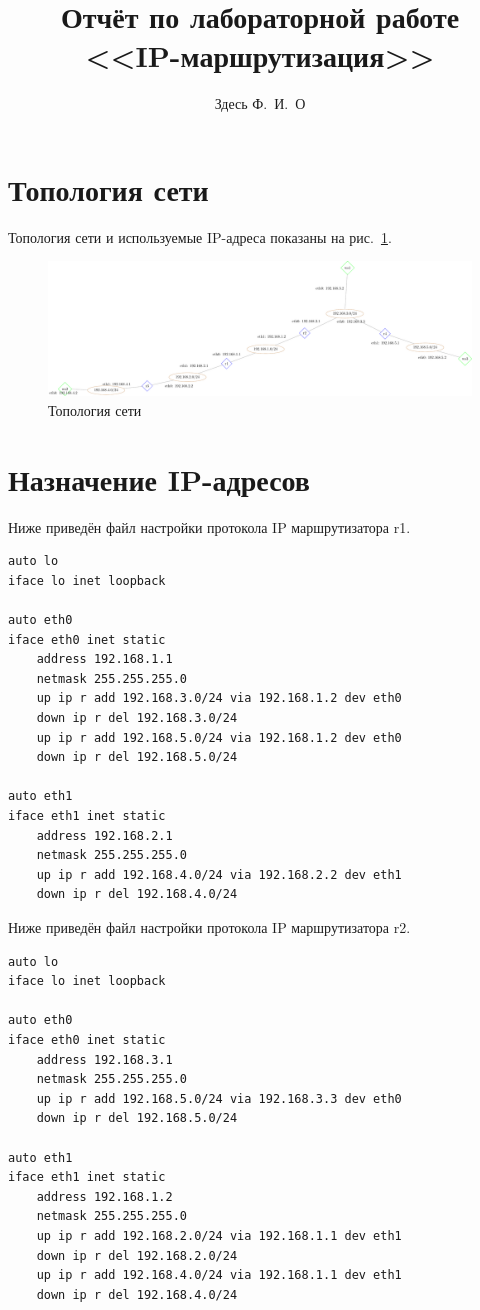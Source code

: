 \documentclass[a4paper,12pt]{article}
\title{Отчёт по лабораторной работе \\ <<IP-маршрутизация>>}
\author{Здесь Ф.~И.~О}
\begin{document}
\maketitle

\tableofcontents


\section{Топология сети}

Топология сети и используемые IP-адреса показаны на рис.~\ref{fig:network}.

\begin{figure}
\centering
\includegraphics[width=\textwidth]{includes/network_gv.pdf}
\caption{Топология сети}
\label{fig:network}
\end{figure}
\newpage

\section{Назначение IP-адресов}
Ниже приведён файл настройки протокола IP маршрутизатора r1.

\begin{Verbatim}
auto lo
iface lo inet loopback

auto eth0
iface eth0 inet static
    address 192.168.1.1
    netmask 255.255.255.0
    up ip r add 192.168.3.0/24 via 192.168.1.2 dev eth0
    down ip r del 192.168.3.0/24
    up ip r add 192.168.5.0/24 via 192.168.1.2 dev eth0
    down ip r del 192.168.5.0/24
    
auto eth1
iface eth1 inet static
    address 192.168.2.1
    netmask 255.255.255.0
    up ip r add 192.168.4.0/24 via 192.168.2.2 dev eth1
    down ip r del 192.168.4.0/24
\end{Verbatim}

Ниже приведён файл настройки протокола IP маршрутизатора r2.

\begin{Verbatim}
auto lo
iface lo inet loopback

auto eth0
iface eth0 inet static
    address 192.168.3.1
    netmask 255.255.255.0
    up ip r add 192.168.5.0/24 via 192.168.3.3 dev eth0
    down ip r del 192.168.5.0/24

auto eth1
iface eth1 inet static
    address 192.168.1.2
    netmask 255.255.255.0
    up ip r add 192.168.2.0/24 via 192.168.1.1 dev eth1
    down ip r del 192.168.2.0/24
    up ip r add 192.168.4.0/24 via 192.168.1.1 dev eth1
    down ip r del 192.168.4.0/24
\end{Verbatim}
\end{document}
